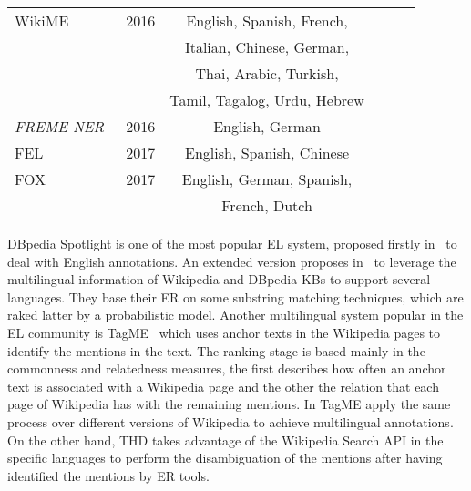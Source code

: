 \documentclass{llncs}
\newcommand{\cmark}{\ding{51}}%
\newcommand{\xmark}{\ding{55}}%
\begin{document}
\begin{table*}[th!]
\begin{tabular}{lccccr}
WikiME \cite{Cross-Lingual-Wikifier-tsai2016cross} & 2016 & English, Spanish, French,&\cmark&\xmark&\xmark\\
& &Italian, Chinese, German,&&&\\
& &Thai, Arabic, Turkish,&&&\\
& &Tamil, Tagalog, Urdu, Hebrew&&&\\\midrule

\textit{FREME NER}~\cite{freme-ner2016}&2016&English, German&\xmark&\cmark&\cmark\\\midrule

FEL~\cite{FEL-pappu2017lightweight}& 2017 &English, Spanish, Chinese&\xmark&\cmark&\xmark\\\midrule

FOX~\cite{fox2017}&2017&English, German, Spanish,&\cmark&\cmark&\cmark\\
& & French, Dutch &&&\\

\bottomrule
\end{tabular}
\end{table*}

DBpedia Spotlight is one of the most popular EL system, proposed firstly in~\cite{mendes2011dbpedia} to deal with English annotations. An extended version proposes in~\cite{daiber2013improving} to leverage the multilingual information of Wikipedia and DBpedia KBs to support several languages. They base their ER on some substring matching techniques, which are raked latter by a probabilistic model. Another multilingual system popular in the EL community is TagME~\cite{ferragina2010tagme} which uses anchor texts in the Wikipedia pages to identify the mentions in the text. The ranking stage is based mainly in the commonness and relatedness measures, the first describes how often an anchor text is associated with a Wikipedia page and the other the relation that each page of Wikipedia has with the remaining mentions. In TagME apply the same process over different versions of Wikipedia to achieve multilingual annotations. On the other hand, THD takes advantage of the Wikipedia Search API in the specific languages to perform the disambiguation of the mentions after having identified the mentions by ER tools.
\end{document}
